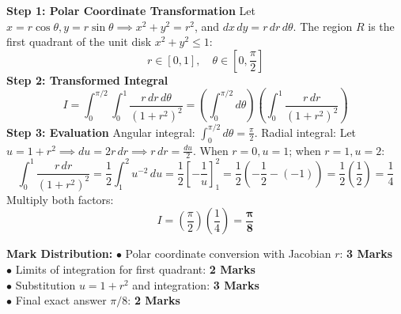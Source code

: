 \begin{solutionbox}
\textbf{Step 1: Polar Coordinate Transformation}
Let $x = r\cos\theta, y = r\sin\theta \implies x^2 + y^2 = r^2$, and $dx \, dy = r \, dr \, d\theta$.
The region $R$ is the first quadrant of the unit disk $x^2 + y^2 \le 1$:
\[
r \in [0, 1], \quad \theta \in \left[0, \frac{\pi}{2}\right]
\]
\textbf{Step 2: Transformed Integral}
\[
I = \int_0^{\pi/2} \int_0^1 \frac{r \, dr \, d\theta}{(1 + r^2)^2} = \left(\int_0^{\pi/2} d\theta\right) \left(\int_0^1 \frac{r \, dr}{(1 + r^2)^2}\right)
\]
\textbf{Step 3: Evaluation}
Angular integral: $\int_0^{\pi/2} d\theta = \frac{\pi}{2}$.
Radial integral: Let $u = 1 + r^2 \implies du = 2r \, dr \implies r \, dr = \frac{du}{2}$.
When $r = 0, u = 1$; when $r = 1, u = 2$:
\[
\int_0^1 \frac{r \, dr}{(1+r^2)^2} = \frac{1}{2} \int_1^2 u^{-2} \, du = \frac{1}{2} \left[ -\frac{1}{u} \right]_1^2 = \frac{1}{2}\left( -\frac{1}{2} - (-1) \right) = \frac{1}{2}\left(\frac{1}{2}\right) = \frac{1}{4}
\]
Multiply both factors:
\[
I = \left(\frac{\pi}{2}\right) \left(\frac{1}{4}\right) = \mathbf{\frac{\pi}{8}}
\]

\begin{markingrubric}
\textbf{Mark Distribution:}
$\bullet$ Polar coordinate conversion with Jacobian $r$: \textbf{3 Marks}\\
$\bullet$ Limits of integration for first quadrant: \textbf{2 Marks}\\
$\bullet$ Substitution $u = 1+r^2$ and integration: \textbf{3 Marks}\\
$\bullet$ Final exact answer $\pi/8$: \textbf{2 Marks}
\end{markingrubric}
\end{solutionbox}

